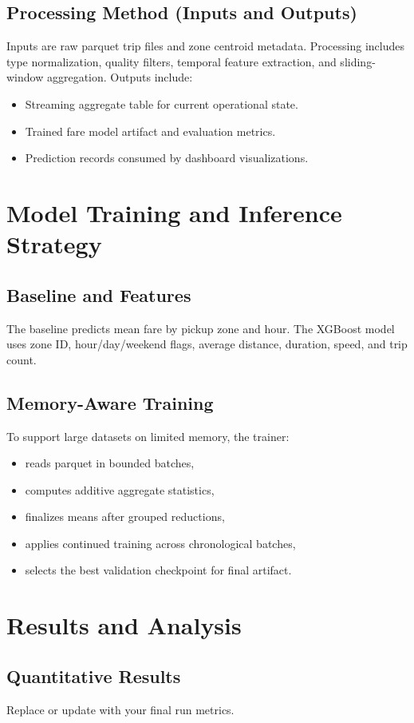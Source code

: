 \documentclass[11pt]{article}
\begin{document}
\subsection{Processing Method (Inputs and Outputs)}
Inputs are raw parquet trip files and zone centroid metadata. Processing includes type normalization, quality filters, temporal feature extraction, and sliding-window aggregation. Outputs include:
\begin{itemize}[leftmargin=1.5em]
    \item Streaming aggregate table for current operational state.
    \item Trained fare model artifact and evaluation metrics.
    \item Prediction records consumed by dashboard visualizations.
\end{itemize}

\section{Model Training and Inference Strategy}
\subsection{Baseline and Features}
The baseline predicts mean fare by pickup zone and hour. The XGBoost model uses zone ID, hour/day/weekend flags, average distance, duration, speed, and trip count.

\subsection{Memory-Aware Training}
To support large datasets on limited memory, the trainer:
\begin{itemize}[leftmargin=1.5em]
    \item reads parquet in bounded batches,
    \item computes additive aggregate statistics,
    \item finalizes means after grouped reductions,
    \item applies continued training across chronological batches,
    \item selects the best validation checkpoint for final artifact.
\end{itemize}

\section{Results and Analysis}
\subsection{Quantitative Results}
Replace or update with your final run metrics.
\end{document}
